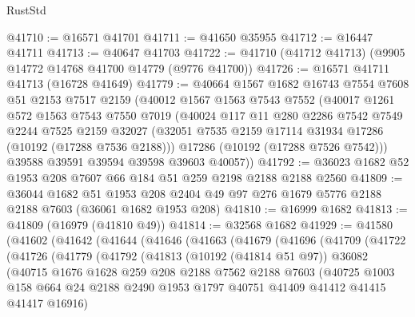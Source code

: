 \begin{lexlean}{RustStd}
\begin{coremodule}
@41710 := @16571 @41701
@41711 := @41650 @35955
@41712 := @16447 @41711
@41713 := @40647 @41703
@41722 := @41710 (@41712 @41713) (@9905 @14772 @14768 @41700 @14779 (@9776 @41700))
@41726 := @16571 @41711 @41713 (@16728 @41649)
@41779 := @40664
    @1567
    @1682
    @16743
    @7554
    @7608
    @51
    @2153
    @7517
    @2159
    (@40012
      @1567
      @1563
      @7543
      @7552
      (@40017
        @1261
        @572
        @1563
        @7543
        @7550
        @7019
        (@40024
          @117
          @11
          @280
          @2286
          @7542
          @7549
          @2244
          @7525
          @2159
          @32027
          (@32051 @7535 @2159 @17114 @31934 @17286 (@10192 (@17288 @7536 @2188)))
          @17286
          (@10192 (@17288 @7526 @7542)))
        @39588
        @39591
        @39594
        @39598
        @39603
        @40057))
@41792 := @36023 @1682 @52 @1953 @208 @7607 @66 @184 @51 @259 @2198 @2188 @2188 @2560
@41809 := @36044
    @1682
    @51
    @1953
    @208
    @2404
    @49
    @97
    @276
    @1679
    @5776
    @2188
    @2188
    @7603
    (@36061 @1682 @1953 @208)
@41810 := @16999 @1682
@41813 := @41809 (@16979 (@41810 @49))
@41814 := @32568 @1682
@41929 := @41580
    (@41602
      (@41642
        (@41644
          (@41646
            (@41663
              (@41679
                (@41696
                  (@41709
                    (@41722
                      (@41726
                        (@41779
                          (@41792
                            (@41813
                              (@10192 (@41814 @51 @97))
                              @36082
                              (@40715
                                @1676
                                @1628
                                @259
                                @208
                                @2188
                                @7562
                                @2188
                                @7603
                                (@40725
                                  @1003
                                  @158
                                  @664
                                  @24
                                  @2188
                                  @2490
                                  @1953
                                  @1797
                                  @40751
                                  @41409
                                  @41412
                                  @41415
                                  @41417
                                  @16916)

\end{coremodule}
\end{lexlean}
